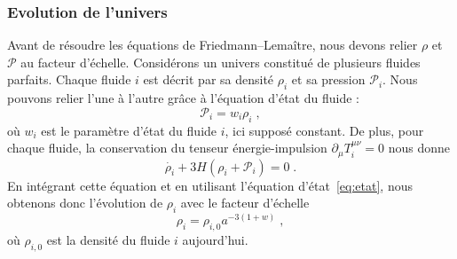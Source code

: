 \documentclass[11pt, twoside, a4paper, openright]{report}
\begin{document}
\subsubsection{Evolution de l'univers}
Avant de résoudre les équations de Friedmann–Lemaître, nous devons relier $\rho$ et $\mathcal{P}$ au facteur d'échelle. Considérons un univers constitué de plusieurs fluides parfaits. Chaque fluide $i$ est décrit par sa densité $\rho_i$ et sa pression $\mathcal{P}_i$. Nous pouvons relier l'une à l'autre grâce à l'équation d'état du fluide :
\begin{equation}
  \label{eq:etat}
  \mathcal{P}_i = w_i \rho_i \; ,
\end{equation}
où $w_i$ est le paramètre d'état du fluide $i$, ici supposé constant.
De plus, pour chaque fluide, la conservation du tenseur énergie-impulsion $\partial_{\mu} T_i^{\mu \nu} = 0$ nous donne
\begin{equation}
  \label{eq:conservation}
  \dot{\rho_i} + 3 H (\rho_i + \mathcal{P}_i) = 0  \; .
\end{equation}
En intégrant cette équation et en utilisant l'équation d'état~\ref{eq:etat}, nous obtenons donc l'évolution de $\rho_i$ avec le facteur d'échelle
\begin{equation}
  \label{eq:rho_vs_a}
  \rho_i = \rho_{i,0} a^{-3(1+w)}  \; ,
\end{equation}
où $\rho_{i,0}$ est la densité du fluide $i$ aujourd'hui.
\end{document}
